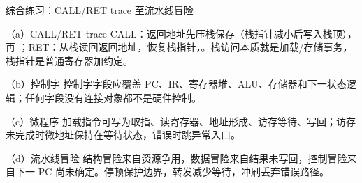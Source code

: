 \begin{chapteranswer}{综合练习：CALL/RET trace 至流水线冒险}
\begin{answersubproblem}{（a）CALL/RET trace}
CALL：返回地址先压栈保存（栈指针减小后写入栈顶），再 ；RET：从栈读回返回地址，恢复栈指针，。栈访问本质就是加载/存储事务，栈指针是普通寄存器加约定。
\end{answersubproblem}
\begin{answersubproblem}{（b）控制字}
控制字字段应覆盖 PC、IR、寄存器堆、ALU、存储器和下一状态逻辑；任何字段没有连接对象都不是硬件控制。
\end{answersubproblem}
\begin{answersubproblem}{（c）微程序}
加载指令可写为取指、读寄存器、地址形成、访存等待、写回；访存未完成时微地址保持在等待状态，错误时跳异常入口。
\end{answersubproblem}
\begin{answersubproblem}{（d）流水线冒险}
结构冒险来自资源争用，数据冒险来自结果未写回，控制冒险来自下一 PC 尚未确定。停顿保护边界，转发减少等待，冲刷丢弃错误路径。
\end{answersubproblem}
\end{chapteranswer}

